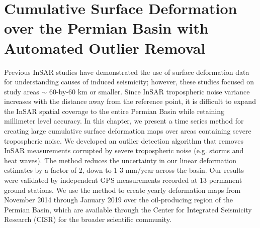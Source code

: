 
\chapter{Cumulative Surface Deformation over the Permian Basin with Automated Outlier Removal}
\label{CHAP:4-GRL}



Previous InSAR studies have demonstrated the use of surface deformation data for understanding causes of induced seismicity; however, these studies focused on study areas $ \sim $ 60-by-60 km or smaller. 
Since InSAR tropospheric noise variance increases with the distance away from the reference point, it is difficult to expand the InSAR spatial coverage to the entire Permian Basin while retaining millimeter level accuracy.  
In this chapter, we present a time series method for creating large cumulative surface deformation maps over areas containing severe tropospheric noise. 
We developed an outlier detection algorithm that removes InSAR measurements corrupted by severe tropospheric noise (e.g. storms and heat waves).
The method reduces the uncertainty in our linear deformation estimates by a factor of 2, down to 1-3 mm/year across the basin. Our results were validated by independent GPS measurements recorded at 13 permanent ground stations. 
We use the method to create yearly deformation maps from November 2014 through January 2019 over the oil-producing region of the Permian Basin, which are available through the Center for Integrated Seismicity Research (CISR) for the broader scientific community. 



